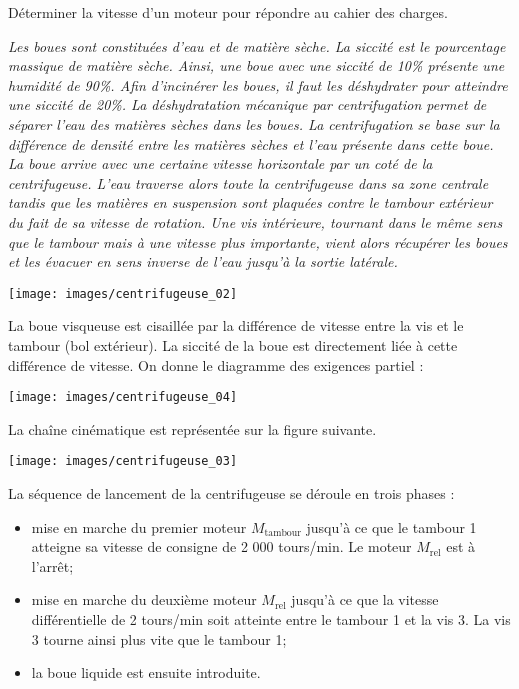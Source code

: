 \documentclass[10pt,fleqn]{article} %
\begin{document}
\begin{multicols}{2}
\begin{multicols}{2}
\begin{obj} Déterminer la vitesse d'un moteur pour répondre au cahier des charges. 
\end{obj}
\ifprof
\else
\footnotesize{
\textit{Les boues sont constituées d’eau et de matière sèche. La siccité est le pourcentage massique de matière
sèche. Ainsi, une boue avec une siccité de 10\% présente une humidité de 90\%. Afin
d’incinérer les boues, il faut les déshydrater pour atteindre une siccité de 20\%. La déshydratation
mécanique par centrifugation permet de séparer l’eau des matières sèches dans les boues.
La centrifugation se base sur la différence de densité entre les matières sèches et l’eau présente dans
cette boue. La boue arrive avec une certaine vitesse horizontale par un coté de la centrifugeuse. L’eau 
traverse alors toute la centrifugeuse dans sa
zone centrale tandis que les matières en suspension sont plaquées contre le tambour extérieur du fait
de sa vitesse de rotation. Une vis intérieure, tournant dans le même sens que le tambour mais à une
vitesse plus importante, vient alors récupérer les boues et les évacuer en sens inverse de l’eau jusqu’à
la sortie latérale.}}


\normalsize

\begin{center}
\texttt{[image: images/centrifugeuse\_02]}
\end{center}

La boue visqueuse est cisaillée par la différence de vitesse entre la vis et le tambour (bol extérieur).
La siccité de la boue est directement liée à cette différence de vitesse. On donne le diagramme des exigences partiel :

\begin{center}
\texttt{[image: images/centrifugeuse\_04]}
\end{center}


La chaîne cinématique est représentée sur la figure
suivante.

\begin{center}
\texttt{[image: images/centrifugeuse\_03]}
\end{center}






La séquence de lancement de la centrifugeuse se déroule en trois phases :
\begin{itemize}
\item mise en marche du premier moteur $M_{\text{tambour}}$ jusqu’à ce que le tambour 1 atteigne sa vitesse
de consigne de 2 000 tours/min. Le moteur $M_{\text{rel}}$ est à l’arrêt;
\item mise en marche du deuxième moteur $M_{\text{rel}}$ jusqu’à ce que la vitesse différentielle de
2 tours/min soit atteinte entre le tambour 1 et la vis 3. La vis 3 tourne ainsi plus vite que le
tambour 1;
\item la boue liquide est ensuite introduite.
\end{itemize}


\end{multicols}
\end{multicols}
\end{document}
